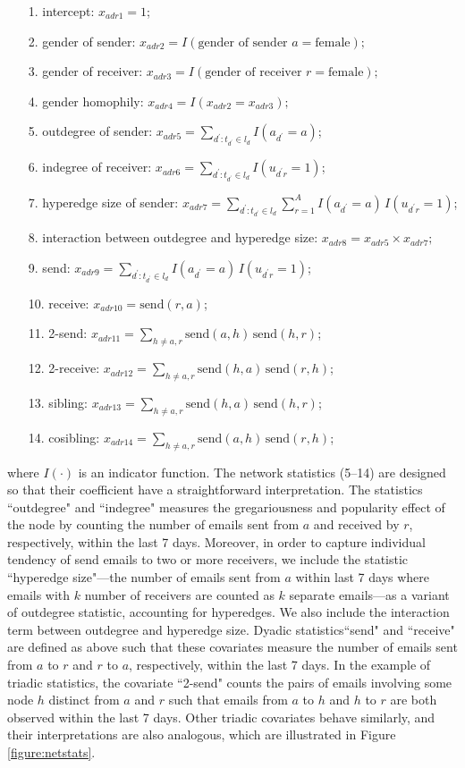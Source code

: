 \documentclass[ba]{imsart}
\numberwithin{equation}{section}
\theoremstyle{plain}
\begin{document}
 	   \begin{itemize}
 	   	\item[1.] intercept: ${x}_{adr1} =1$;
 	   	 \item[2.] gender of sender: ${x}_{adr2} = I(\mbox{gender of sender } a= \mbox{female});$
 	   	 \item[3.] gender of receiver: ${x}_{adr3} = I(\mbox{gender of receiver } r= \mbox{female});$
 	   	 \item[4.] gender homophily: ${x}_{adr4} = I({x}_{adr2}={x}_{adr3});$ 	   		
 	   	\item[5.] outdegree of sender: ${x}_{adr5} =\sum_{d^\prime: t_{d^\prime} \in l_d} I(a_{d^\prime} = a)$;
 	   	\item[6.] indegree of receiver: ${x}_{adr6}=\sum_{d^\prime: t_{d^\prime} \in l_d} I(u_{d^\prime r} = 1)$;
 	   	\item[7.] hyperedge size of sender: ${x}_{adr7}=\sum_{d^\prime: t_{d^\prime} \in l_d} \sum_{r=1}^A I(a_{d^\prime} = a)\,I(u_{d^\prime r} = 1)$;
 	  \item[8.] interaction between outdegree and hyperedge size: ${x}_{adr8} = {x}_{adr5}\times{x}_{adr7};$
 	   	\item[9.] send: ${x}_{adr9}=\sum_{d^\prime: t_{d^\prime} \in l_d} I(a_{d^\prime} = a)\,I(u_{d^\prime r} = 1)$;
 	   	\item[10.] receive: ${x}_{adr10}=\mbox{send}(r,a)$;
 	   	\item[11.] 2-send: ${x}_{adr11} = \sum_{h \neq a, r} \mbox{send}(a,h)\,\mbox{send}(h,r)$;
 	   	\item[12.] 2-receive: ${x}_{adr12}= \sum_{h \neq a, r} \mbox{send}(h,a)\,\mbox{send}(r,h)$;
 	   	\item[13.] sibling: ${x}_{adr13}=\sum_{h \neq a, r} \mbox{send}(h,a)\,\mbox{send}(h,r)$;
 	   	\item[14.] cosibling: ${x}_{adr14}=\sum_{h \neq a, r} \mbox{send}(a,h)\,\mbox{send}(r,h)$;
 	 	   \end{itemize}
 	   where $I(\cdot)$ is an indicator function. The network statistics (5--14) are designed so that their coefficient have a straightforward interpretation. The statistics ``outdegree" and ``indegree" measures the gregariousness and popularity effect of the node by counting the number of emails sent from $a$ and received by $r$, respectively, within the last 7 days. Moreover, in order to capture individual tendency of send emails to two or more receivers, we include the statistic ``hyperedge size"---the number of emails sent from $a$ within last 7 days where emails with $k$ number of receivers are counted as $k$ separate emails---as a variant of outdegree statistic, accounting for hyperedges. We also include the interaction term between outdegree and hyperedge size. Dyadic statistics``send" and ``receive" are defined as above such that these covariates measure the number of emails sent from $a$ to $r$ and $r$ to $a$, respectively, within the last 7 days. In the example of triadic statistics, the covariate ``2-send" counts the pairs of emails involving some node $h$ distinct from $a$ and $r$ such that emails from $a$ to $h$ and $h$ to $r$ are both observed within the last 7 days. Other triadic covariates behave similarly, and their interpretations are also analogous, which are illustrated in Figure \ref{figure:netstats}.
\end{document}
